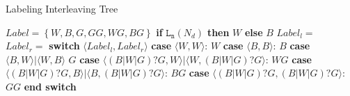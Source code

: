 \documentclass[runningheads]{llncs}
\newcommand{\pair}[1]{{\langle{#1}\rangle}}
\newcommand{\set}[1]{\left\{{#1}\right\}}
\begin{document}
\begin{algorithm}[ht]
\small
    \centering
    \caption{Labeling Interleaving Tree}\label{algo:labelinttree}
    \begin{algorithmic}[1]
        \State $\mathit{Label} = \set{W, B, G, GG, WG, BG}$
                \State \textbf{if} {$\mathtt{L_n}(N_d)$} \textbf{then} \Return $\mathit{W}$
                \State \textbf{else} \Return $\mathit{B}$
                \State \Return {}
                \State \Return {}
            \Else
                \State $\mathit{Label_l} = $ 
                \State $\mathit{Label_r} = $ 
                \State \textbf{switch} {$\pair{\mathit{Label_l},\mathit{Label_r}}$}
                    \State \quad \textbf{case} {$\pair{\mathit{W,W}}$}:
                    \State \quad\quad\Return $\mathit{W}$
                    \State \quad\textbf{case} {$\pair{\mathit{B,B}}$}:
                    \State \quad\quad\Return $\mathit{B}$
                    \State \quad\textbf{case} {$\pair{\mathit{B,W}} | \pair{\mathit{W,B}}$}
                    \State \quad\quad\Return $\mathit{G}$
                    \State \quad\textbf{case} {$\pair{\mathit{(B|W|G)?G,W}} | \pair{\mathit{W,(B|W|G)?G}} $}: \State \quad\quad\Return $\mathit{WG}$
                    \State \quad\textbf{case} {$\pair{\mathit{(B|W|G)?G,B}} | \pair{\mathit{B,(B|W|G)?G}} $}: \State \quad\quad\Return $\mathit{BG}$
                    \State \quad\textbf{case} {$\pair{\mathit{(B|W|G)?G,(B|W|G)?G}}$}:
                    \State \quad\quad\Return $\mathit{GG}$
                \State \textbf{end switch}
            \EndIf
        \EndFunction
    \end{algorithmic}

\end{algorithm}
\vspace{-0.3cm}
\end{document}
